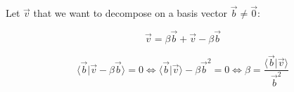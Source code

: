 \documentclass[aps,12pt]{revtex4}
\begin{document}
Let $\vec{v}$ that we want to decompose on a basis vector $\vec{b} \not= \vec{0}$:

\begin{equation}
	\vec{v} = \beta \vec{b} + \vec{v} - \beta \vec{b}
\end{equation}

\begin{equation}
	\langle	\vec{b} \vert \vec{v} - \beta \vec{b}\rangle = 0 \iff \langle \vec{b} \vert \vec{v} \rangle - \beta \vec{b}^2 = 0
	\iff \beta = \dfrac{\langle \vec{b} \vert \vec{v} \rangle}{\vec{b}^2}
\end{equation}
\end{document}
